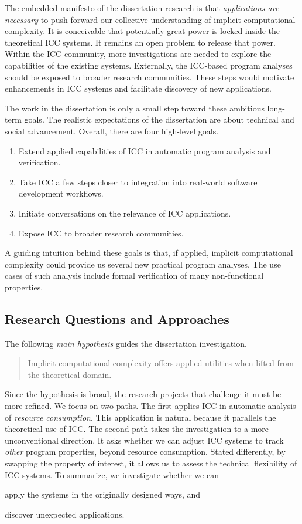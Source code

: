 The embedded manifesto of the dissertation research is that \emph{applications
are necessary} to push forward our collective understanding of implicit
computational complexity. It is conceivable that potentially great power is
locked inside the theoretical ICC systems. It remains an open problem to release
that power. Within the ICC community, more investigations are needed to explore
the capabilities of the existing systems. Externally, the ICC-based program
analyses should be exposed to broader research communities. These steps would
motivate enhancements in ICC systems and facilitate discovery of new
applications.

The work in the dissertation is only a small step toward these ambitious
long-term goals. The realistic expectations of the dissertation are about
technical and social advancement. Overall, there are four high-level goals.
\begin{enumerate}
\item Extend {applied} capabilities of ICC in automatic program analysis and
verification.
\item Take ICC a few steps closer to integration into real-world software
development workflows.
\item Initiate conversations on the relevance of ICC applications.
\item Expose ICC to broader research communities.
\end{enumerate}
A guiding intuition behind these goals is that, {if applied}, implicit
computational complexity could provide us several new practical program
analyses. The use cases of such analysis include formal verification of many
non-functional properties.

\subsection{Research Questions and Approaches}
\label{sec:aicc-approaches}

The following \emph{main hypothesis} guides the dissertation investigation.
\begin{quote}
\noindent Implicit computational complexity offers applied utilities when lifted
from the theoretical domain.
\end{quote}
Since the hypothesis is broad, the research projects that challenge it must be
more refined. We focus on two paths. The first applies ICC in automatic analysis
of \emph{resource consumption}. This application is natural because it parallels
the theoretical use of ICC. The second path takes the investigation to a more
unconventional direction. It asks whether we can adjust ICC systems to track
\emph{other} program properties, beyond resource consumption. Stated
differently, by swapping the property of interest, it allows us to assess the
technical flexibility of ICC systems. To summarize, we investigate whether we
can \begin{enumerate*}[label=(\roman*)]
\item apply the systems in the originally designed ways, and
\item discover unexpected applications.
\end{enumerate*}

